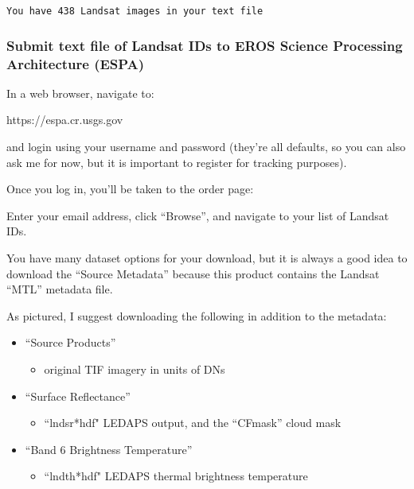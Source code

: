 \documentclass{article}
\begin{document}
    \begin{Verbatim}[commandchars=\\\{\}]
You have 438 Landsat images in your text file
    \end{Verbatim}

    \subsubsection{Submit text file of Landsat IDs to EROS Science
Processing Architecture
(ESPA)}\label{submit-text-file-of-landsat-ids-to-eros-science-processing-architecture-espa}

In a web browser, navigate to:

https://espa.cr.usgs.gov

and login using your username and password (they're all defaults, so you
can also ask me for now, but it is important to register for tracking
purposes).

Once you log in, you'll be taken to the order page:

Enter your email address, click ``Browse'', and navigate to your list of
Landsat IDs.

You have many dataset options for your download, but it is always a good
idea to download the ``Source Metadata'' because this product contains
the Landsat ``MTL'' metadata file.

As pictured, I suggest downloading the following in addition to the
metadata:

\begin{itemize}
\itemsep1pt\parskip0pt
\item
  ``Source Products''

  \begin{itemize}
  \itemsep1pt\parskip0pt
  \item
    original TIF imagery in units of DNs
  \end{itemize}
\item
  ``Surface Reflectance''

  \begin{itemize}
  \itemsep1pt\parskip0pt
  \item
    ``lndsr*hdf" LEDAPS output, and the ``CFmask'' cloud mask
  \end{itemize}
\item
  ``Band 6 Brightness Temperature''

  \begin{itemize}
  \itemsep1pt\parskip0pt
  \item
    ``lndth*hdf" LEDAPS thermal brightness temperature
  \end{itemize}
\end{itemize}
\end{document}
